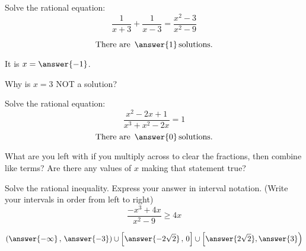 \documentclass{ximera}
\author{Carl Stitz \and Jeff Zeager \and  Bobby Ramsey}
\begin{document}
\begin{exercise}
	Solve the rational equation:
	\[ \frac{1}{x+3} + \frac{1}{x-3} = \frac{x^2-3}{x^2-9} \]
	
	\[ \text{There are } \, \answer{1} \, \text{solutions.} \]
	\begin{exercise}
		It is $x = \answer{-1}$.
		\begin{exercise}
			Why is $x=3$ NOT a solution?
			\begin{multipleChoice}
			\end{multipleChoice}
		\end{exercise}
	\end{exercise}
\end{exercise}

\begin{exercise}
	Solve the rational equation:
	\[ \frac{x^2-2x+1}{x^3+x^2-2x} = 1 \]
	\[ \text{There are } \, \answer{0} \, \text{solutions.} \]
	\begin{feedback}
		What are you left with if you multiply across to clear the fractions, then combine like terms?  Are there any values of $x$ making that statement true?	
	\end{feedback}		
\end{exercise}

\begin{exercise}
	Solve the rational inequality.  Express your answer in interval notation.  (Write your intervals in order from left to right)
	\[ \frac{-x^3+4x}{x^2-9} \geq 4x  \]
	
	\[ \left( \answer{-\infty} \, , \, \answer{-3} \right) \cup \left[ \answer{-2\sqrt{2}} \, , \, 0 \right] \cup \left[ \answer{2\sqrt{2}} , \answer{3} \right) \]
		
\end{exercise}
\end{document}
